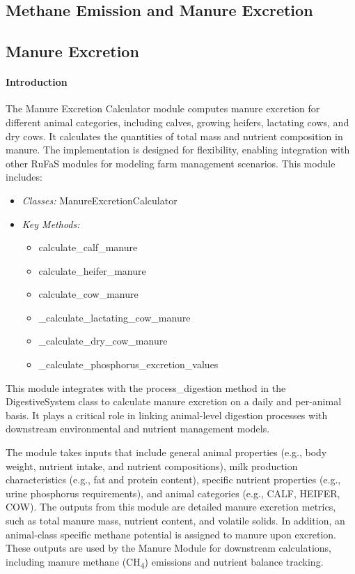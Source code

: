 \documentclass{article}
\begin{document}
\begin{refsection}
\section{Methane Emission and Manure Excretion}
\subsection{Manure Excretion}
 
    \paragraph{Introduction}
    The Manure Excretion Calculator module computes manure excretion for different animal categories, including calves, growing heifers, lactating cows, and dry cows. It calculates the quantities of total mass and nutrient composition in manure. The implementation is designed for flexibility, enabling integration with other RuFaS modules for modeling farm management scenarios.
    This module includes:
    \vspace{0.2cm}

    \begin{itemize}
        \item \textit{Classes:} ManureExcretionCalculator
        \item \textit{Key Methods:}
        \begin{itemize}
            \item calculate\_calf\_manure
            \item calculate\_heifer\_manure
            \item calculate\_cow\_manure
            \item \_calculate\_lactating\_cow\_manure
            \item \_calculate\_dry\_cow\_manure
            \item \_calculate\_phosphorus\_excretion\_values
        \end{itemize}


    \end{itemize}


    This module integrates with the process\_digestion method in the DigestiveSystem class to calculate manure excretion on a daily and per-animal basis. It plays a critical role in linking animal-level digestion processes with downstream environmental and nutrient management models.
    
    The module takes inputs that include general animal properties (e.g., body weight, nutrient intake, and nutrient compositions), milk production characteristics (e.g., fat and protein content), specific nutrient properties (e.g., urine phosphorus requirements), and animal categories (e.g., CALF, HEIFER, COW). The outputs from this module are detailed manure excretion metrics, such as total manure mass, nutrient content, and volatile solids. In addition, an animal-class specific methane potential is assigned to manure upon excretion. These outputs are used by the Manure Module for downstream calculations, including manure methane (CH\textsubscript{4}) emissions and nutrient balance tracking.



\end{refsection}
\end{document}
